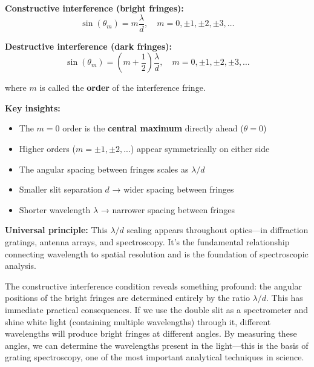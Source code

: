 \documentclass[
  a4paper,
]{book}
\providecommand{\tightlist}{%
  \setlength{\itemsep}{0pt}\setlength{\parskip}{0pt}}
\begin{document}
\begin{tcolorbox}[enhanced jigsaw, breakable, toptitle=1mm, bottomrule=.15mm, colbacktitle=quarto-callout-important-color!10!white, title=\textcolor{quarto-callout-important-color}{\faExclamation}\hspace{0.5em}{Interference Conditions for Double Slit}, arc=.35mm, rightrule=.15mm, bottomtitle=1mm, opacityback=0, toprule=.15mm, coltitle=black, leftrule=.75mm, opacitybacktitle=0.6, colback=white, left=2mm, titlerule=0mm, colframe=quarto-callout-important-color-frame]

\textbf{Constructive interference (bright fringes):}
\[\sin(\theta_m) = m \frac{\lambda}{d}, \quad m = 0, \pm 1, \pm 2, \pm 3, \ldots\]

\textbf{Destructive interference (dark fringes):}
\[\sin(\theta_m) = \left(m + \frac{1}{2}\right) \frac{\lambda}{d}, \quad m = 0, \pm 1, \pm 2, \pm 3, \ldots\]

where \(m\) is called the \textbf{order} of the interference fringe.

\textbf{Key insights:}

\begin{itemize}
\tightlist
\item
  The \(m=0\) order is the \textbf{central maximum} directly ahead
  (\(\theta = 0\))
\item
  Higher orders (\(m = \pm 1, \pm 2, ...\)) appear symmetrically on
  either side
\item
  The angular spacing between fringes scales as \(\lambda/d\)
\item
  Smaller slit separation \(d\) → wider spacing between fringes
\item
  Shorter wavelength \(\lambda\) → narrower spacing between fringes
\end{itemize}

\textbf{Universal principle:} This \(\lambda/d\) scaling appears
throughout optics---in diffraction gratings, antenna arrays, and
spectroscopy. It's the fundamental relationship connecting wavelength to
spatial resolution and is the foundation of spectroscopic analysis.

\end{tcolorbox}

The constructive interference condition reveals something profound: the
angular positions of the bright fringes are determined entirely by the
ratio \(\lambda/d\). This has immediate practical consequences. If we
use the double slit as a spectrometer and shine white light (containing
multiple wavelengths) through it, different wavelengths will produce
bright fringes at different angles. By measuring these angles, we can
determine the wavelengths present in the light---this is the basis of
grating spectroscopy, one of the most important analytical techniques in
science.
\end{document}
